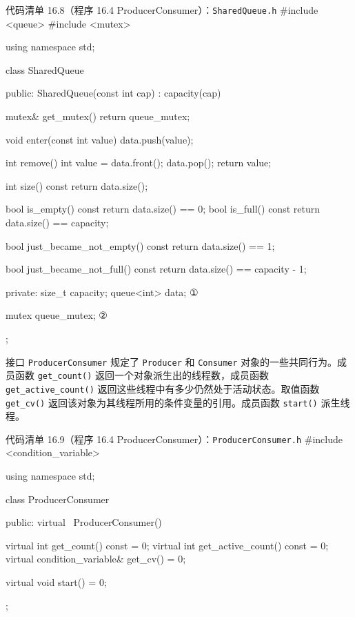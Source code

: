 \begin{codeboxt}{代码清单 16.8（程序 16.4 ProducerConsumer）：\texttt{Shared\allowbreak{}Queue.\allowbreak{}h}}
#include <queue>
#include <mutex>

using namespace std;

class SharedQueue
{
public:
    SharedQueue(const int cap) : capacity(cap) {}

    mutex& get_mutex() { return queue_mutex; }

    void enter(const int value) { data.push(value); }

    int remove()
    {
        int value = data.front();
        data.pop();
        return value;
    }

    int size() const { return data.size(); }

    bool is_empty() const { return data.size() == 0; }
    bool is_full()  const { return data.size() == capacity; }

    bool just_became_not_empty() const
    {
        return data.size() == 1;
    }

    bool just_became_not_full() const
    {
        return data.size() == capacity - 1;
    }

private:
    size_t capacity;
    queue<int> data;     ①

    mutex queue_mutex;   ②
};
\end{codeboxt}
\par
{}\par

接口 \texttt{Producer\allowbreak{}Consumer} 规定了 \texttt{Producer} 和 \texttt{Consumer} 对象的一些共同行为。成员函数 \texttt{get\_\allowbreak{}count(\allowbreak{})\allowbreak{}} 返回一个对象派生出的线程数，成员函数 \texttt{get\_\allowbreak{}active\_\allowbreak{}count(\allowbreak{})\allowbreak{}} 返回这些线程中有多少仍然处于活动状态。取值函数 \texttt{get\_cv()} 返回该对象为其线程所用的条件变量的引用。成员函数 \texttt{start()} 派生线程。

\begin{codeboxt}{代码清单 16.9（程序 16.4 ProducerConsumer）：\texttt{Producer\allowbreak{}Consumer.\allowbreak{}h}}
#include <condition_variable>

using namespace std;

class ProducerConsumer
{
public:
    virtual ~ProducerConsumer() {}

    virtual int get_count()        const = 0;
    virtual int get_active_count() const = 0;
    virtual condition_variable& get_cv() = 0;

    virtual void start() = 0;
};
\end{codeboxt}

